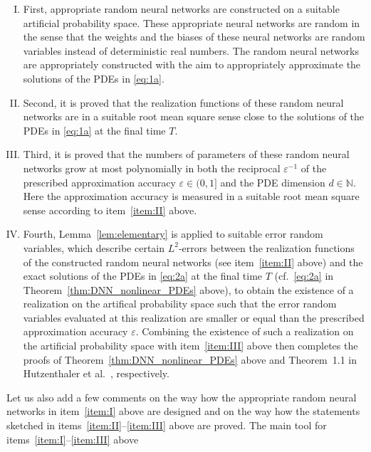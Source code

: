 \documentclass[12pt,AutoFakeBold,AutoFakeSlant]{article}
\theoremstyle{definition}
\newcommand{\N}{\mathbb{N}}
\begin{document}
	\begin{enumerate}[(I)]
	\item 
	\label{item:I}
	First, appropriate random neural networks are constructed 
	on a suitable artificial probability space. 
	These appropriate neural networks 
	are random in the sense that the weights and the biases of these 
	neural networks are random variables instead of deterministic real numbers. 
	The random neural networks are appropriately constructed with the aim 
	to appropriately approximate the solutions of the PDEs in \eqref{eq:1a}.
	\item 
	\label{item:II}
	Second, it is proved that the realization functions of 
	these random neural networks are in a suitable root mean square sense 
	close to the solutions of the PDEs in \eqref{eq:1a} at the final time $ T $. 
	\item 
	\label{item:III}
	Third, it is proved that the numbers of parameters 
	of these random neural networks 
	grow at most polynomially in both 
	the reciprocal $ \varepsilon^{ - 1 } $ of the 
	prescribed approximation accuracy $ \varepsilon \in (0,1] $ 
	and the PDE dimension $ d \in \N $. 
	Here the approximation accuracy is measured in a suitable root mean square sense 
	according to item~\eqref{item:II} above.
	\item 
	Fourth, Lemma~\ref{lem:elementary} is applied 
	to suitable error random variables, which describe 
	certain $ L^2 $-errors between the realization functions 
	of the constructed random neural networks 
	(see item~\eqref{item:II} above)
	and the exact solutions of the PDEs in \eqref{eq:2a} at the final time $ T $
	(cf.\ \eqref{eq:2a} in Theorem~\ref{thm:DNN_nonlinear_PDEs} above), 
	to obtain the existence of a realization on 
	the artifical probability space such that 
	the error random variables evaluated 
	at this realization are smaller or equal than 
	the prescribed approximation accuracy $ \varepsilon $. 
	Combining the existence of such a realization 
	on the artificial probability space 
	with item~\eqref{item:III} above 
	then completes 
	the proofs of 
	Theorem~\ref{thm:DNN_nonlinear_PDEs} above 
	and 
	Theorem~1.1 in 
	Hutzenthaler et al.~\cite{hutzenthaler2020proof}, 
	respectively. 
	\end{enumerate}
	Let us also add a few comments 
	on the way how the appropriate random neural networks 
	in item~\eqref{item:I} above are designed 
	and on the way how the statements sketched in 
	items~\eqref{item:II}--\eqref{item:III} above are proved. 
	The main tool for items~\eqref{item:I}--\eqref{item:III} above 
\end{document}
